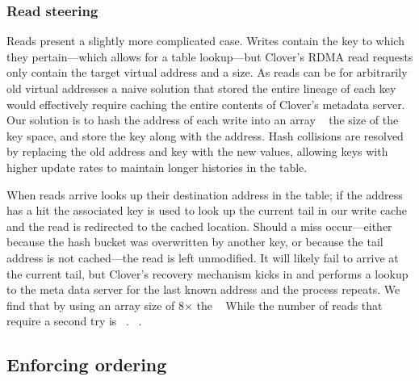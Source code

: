 
\subsubsection{Read steering}

Reads present a slightly more complicated case. Writes contain the key
to which they pertain---which allows for a table lookup---but Clover's
RDMA read requests only contain the target virtual address and a size.
As reads can be for arbitrarily old virtual addresses a naive solution
that stored the entire lineage of each key would effectively require
caching the entire contents of Clover's metadata server.  Our solution
is to hash the address of each write into an array ~
the size of the key space, and store the key along with the address.
Hash collisions are resolved by replacing the old address and key with
the new values, allowing keys with higher update rates to maintain
longer histories in the table.

When reads arrive {\sword} looks up their destination address in the
table; if the address has a hit the associated key is used to look up
the current tail in our write cache and the read is redirected to the
cached location.  Should a miss occur---either because the hash bucket
was overwritten by another key, or because the tail address is not
cached---the read is left unmodified.  It will likely fail to arrive
at the current tail, but Clover's recovery mechanism kicks in and
performs a lookup to the meta data server for the last known address
and the process repeats. We find that by using an array size of
8$\times$ the ~ While
the number of reads that require a second try is ~. ~.

\subsection{Enforcing ordering}


